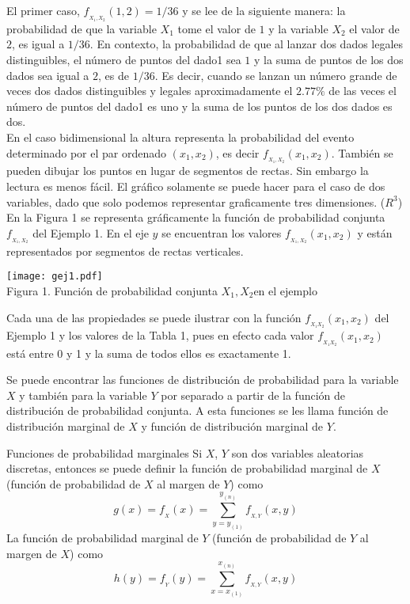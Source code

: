 \documentclass[base=hide,12pt]{elegantbook}
\begin{document}
\vspace{.5cm}
%
%	
El primer caso, $f_{_{X_{1},X_{2}}}(1,2)=1/36$ y se lee de la siguiente manera: la probabilidad de que la variable $X_{1}$ tome el valor de $1$ y la variable $X_{2}$ el valor de $2$, es igual a $1/36$. En contexto, la probabilidad de que al lanzar dos dados legales distinguibles, el número de puntos del dado1 sea $1$ y la suma de puntos de los dos dados sea igual a $2$, es de $1/36$. Es decir, cuando se lanzan un número grande de veces dos dados distinguibles y legales aproximadamente el $2.77\%$ de las veces el número de  puntos del dado1 es uno y la suma de los puntos de los dos dados es dos. \\
%
En el caso bidimensional la altura representa la probabilidad del evento determinado por el par ordenado $(x_1,x_2)$, es decir $f_{_{X_{1},X_{2}}}(x_{1},x_{2})$. También se pueden dibujar los puntos en lugar de segmentos de rectas. Sin embargo la lectura es menos fácil. El gráfico solamente se puede hacer para el caso de dos variables, dado que solo podemos representar graficamente tres dimensiones. ($R^{3}$)\\

En la Figura 1 se representa gráficamente la función de probabilidad conjunta $f_{_{X_{1},X_{2}}}$ del Ejemplo 1. En el eje $y$ se encuentran los valores $f_{_{X_{1},X_{2}}}(x_1,x_2)$ y están representados por segmentos de rectas verticales.

\begin{center}
\texttt{[image: gej1.pdf]} \\
Figura 1. Función de probabilidad conjunta $X_{1},X_{2}$en el ejemplo 
\end{center}

%			
Cada una de las propiedades se puede ilustrar con la función $f_{_{X_1X_2}}(x_1,x_2)$ del Ejemplo 1 y los valores de la Tabla 1, pues en efecto cada valor $f_{_{X_1X_2}}(x_1,x_2)$ está entre 0 y 1 y la suma de todos ellos es exactamente 1.

Se puede encontrar las funciones de distribución de probabilidad para la variable $X$ y también para la variable $Y$ por separado a partir de la función de distribución de probabilidad conjunta. A esta funciones se les llama función de distribución  marginal de $X$ y función de distribución marginal de $Y$.
	
\begin{Box4}{Funciones de probabilidad marginales}
%				
Si $X$, $Y$ son dos variables aleatorias discretas, entonces se puede definir la función de probabilidad marginal de $X$ (función de probabilidad de $X$ al margen de $Y$) como
\[g(x)=f_{_{X}}(x)=\sum_{y=y_{(1)}}^{y_{(n)}}f_{_{X,Y}}(x,y)\]
La función de probabilidad marginal de $Y$ (función de probabilidad de $Y$ al margen de $X$) como
\[h(y)=f_{_{Y}}(y)=\sum_{x=x_{(1)}}^{x_{(n)}}f_{_{X,Y}}(x,y)\]
\end{Box4}
\end{document}
